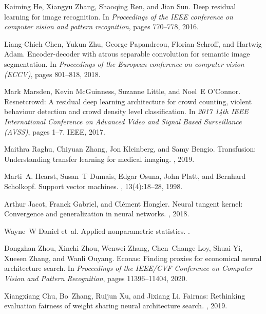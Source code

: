 \documentclass{article}
\begin{document}
\begin{thebibliography}{10}
Kaiming He, Xiangyu Zhang, Shaoqing Ren, and Jian Sun.
\newblock Deep residual learning for image recognition.
\newblock In {\em Proceedings of the IEEE conference on computer vision and
  pattern recognition}, pages 770--778, 2016.

Liang-Chieh Chen, Yukun Zhu, George Papandreou, Florian Schroff, and Hartwig
  Adam.
\newblock Encoder-decoder with atrous separable convolution for semantic image
  segmentation.
\newblock In {\em Proceedings of the European conference on computer vision
  (ECCV)}, pages 801--818, 2018.

Mark Marsden, Kevin McGuinness, Suzanne Little, and Noel~E O'Connor.
\newblock Resnetcrowd: A residual deep learning architecture for crowd
  counting, violent behaviour detection and crowd density level classification.
\newblock In {\em 2017 14th IEEE International Conference on Advanced Video and
  Signal Based Surveillance (AVSS)}, pages 1--7. IEEE, 2017.

Maithra Raghu, Chiyuan Zhang, Jon Kleinberg, and Samy Bengio.
\newblock Transfusion: Understanding transfer learning for medical imaging.
, 2019.

Marti~A. Hearst, Susan~T Dumais, Edgar Osuna, John Platt, and Bernhard
  Scholkopf.
\newblock Support vector machines.
, 13(4):18--28,
  1998.

Arthur Jacot, Franck Gabriel, and Cl{\'e}ment Hongler.
\newblock Neural tangent kernel: Convergence and generalization in neural
  networks.
, 2018.

Wayne~W Daniel et~al.
\newblock Applied nonparametric statistics.
.

Dongzhan Zhou, Xinchi Zhou, Wenwei Zhang, Chen~Change Loy, Shuai Yi, Xuesen
  Zhang, and Wanli Ouyang.
\newblock Econas: Finding proxies for economical neural architecture search.
\newblock In {\em Proceedings of the IEEE/CVF Conference on Computer Vision and
  Pattern Recognition}, pages 11396--11404, 2020.

Xiangxiang Chu, Bo~Zhang, Ruijun Xu, and Jixiang Li.
\newblock Fairnas: Rethinking evaluation fairness of weight sharing neural
  architecture search.
, 2019.


\end{thebibliography}
\end{document}
